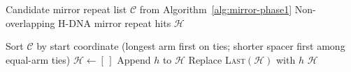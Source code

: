 \documentclass{article}
\begin{document}
\begin{algorithm}
\caption{HSeeker Phase 2: Overlap Removal}
\label{alg:mirror-phase2}
\small
\begin{algorithmic}[1]
\Require Candidate mirror repeat list $\mathcal{C}$ from Algorithm~\ref{alg:mirror-phase1}
\Ensure Non-overlapping H-DNA mirror repeat hits $\mathcal{H}$

\State Sort $\mathcal{C}$ by start coordinate (longest arm first on ties; shorter spacer first among equal-arm ties)
\State $\mathcal{H} \gets [\,]$
        \State Append $h$ to $\mathcal{H}$ 
        \State Replace \textsc{Last}$(\mathcal{H})$ with $h$ 
    \EndIf
\EndFor
\State \Return $\mathcal{H}$
\end{algorithmic}
\end{algorithm}

\clearpage
\end{document}
